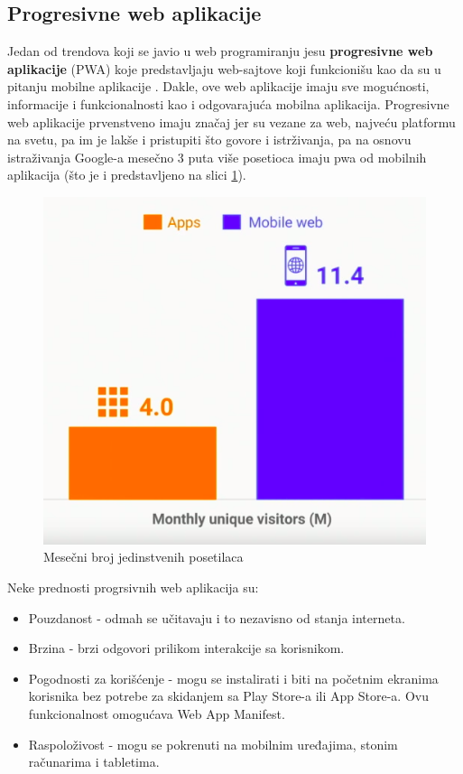 \documentclass[a4paper]{article}
\begin{document}
\subsection{Progresivne web aplikacije}
\label{subsec:progresivne web aplikacije}

Jedan od trendova koji se javio u web programiranju jesu \textbf{progresivne web aplikacije} (PWA) koje predstavljaju web-sajtove koji funkcionišu kao da su u pitanju mobilne aplikacije \cite{pwa}. Dakle, ove web aplikacije imaju sve mogućnosti, informacije i funkcionalnosti kao i odgovarajuća mobilna aplikacija. Progresivne web aplikacije prvenstveno imaju značaj jer su vezane za web, najveću platformu na svetu, pa im je lakše i pristupiti što govore i istrživanja, pa na osnovu istraživanja Google-a mesečno 3 puta više posetioca imaju pwa od mobilnih aplikacija (što je i predstavljeno na slici \ref{fig:pwa}).

\begin{figure}[h!]
\begin{center}
\includegraphics[scale=0.4]{slike/pwa.png}
\end{center}
\caption{Mesečni broj jedinstvenih posetilaca}
\label{fig:pwa}
\end{figure}

Neke prednosti progrsivnih web aplikacija su:
\begin{itemize}
    \item Pouzdanost - odmah se učitavaju i to nezavisno od stanja interneta.
    \item Brzina - brzi odgovori prilikom interakcije sa korisnikom.
    \item Pogodnosti za korišćenje - mogu se instalirati i biti na početnim ekranima korisnika bez potrebe za skidanjem sa Play Store-a ili App Store-a. Ovu funkcionalnost omogućava Web App Manifest.
    \item Raspoloživost - mogu se pokrenuti na mobilnim uređajima, stonim računarima i tabletima.
\end{itemize}
\end{document}
